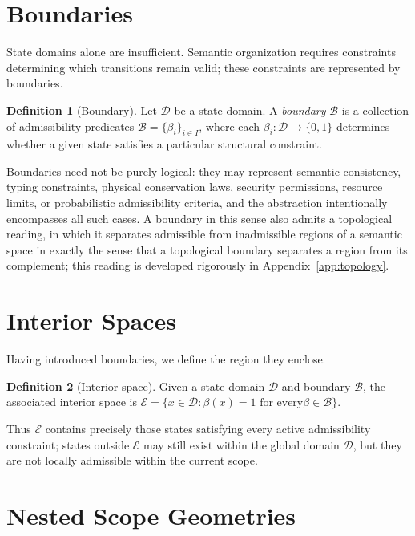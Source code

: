 \documentclass[11pt,twoside,openright]{book}
\numberwithin{equation}{chapter}
\theoremstyle{definition}
\newtheorem{definition}{Definition}[chapter]
\theoremstyle{plain}
\theoremstyle{remark}
\theoremstyle{definition}
\newcommand{\Boundary}{\mathcal{B}}
\newcommand{\Interior}{\mathcal{E}}
\newcommand{\Domain}{\mathcal{D}}
\begin{document}
\section{Boundaries}

State domains alone are insufficient. Semantic organization requires
constraints determining which transitions remain valid; these constraints
are represented by boundaries.

\begin{definition}[Boundary]
Let $\Domain$ be a state domain. A \emph{boundary} $\Boundary$ is a
collection of admissibility predicates $\Boundary=\{\beta_i\}_{i\in I}$,
where each $\beta_i:\Domain\to\{0,1\}$ determines whether a given state
satisfies a particular structural constraint.
\end{definition}

Boundaries need not be purely logical: they may represent semantic
consistency, typing constraints, physical conservation laws, security
permissions, resource limits, or probabilistic admissibility criteria,
and the abstraction intentionally encompasses all such cases. A boundary
in this sense also admits a topological reading, in which it separates
admissible from inadmissible regions of a semantic space in exactly the
sense that a topological boundary separates a region from its
complement; this reading is developed rigorously in Appendix~\ref{app:topology}.

\section{Interior Spaces}

Having introduced boundaries, we define the region they enclose.

\begin{definition}[Interior space]
Given a state domain $\Domain$ and boundary $\Boundary$, the associated
interior space is $\Interior=\{x\in\Domain:\beta(x)=1\text{ for every
}\beta\in\Boundary\}$.
\end{definition}

Thus $\Interior$ contains precisely those states satisfying every active
admissibility constraint; states outside $\Interior$ may still exist within
the global domain $\Domain$, but they are not locally admissible within the
current scope.

\section{Nested Scope Geometries}
\end{document}
